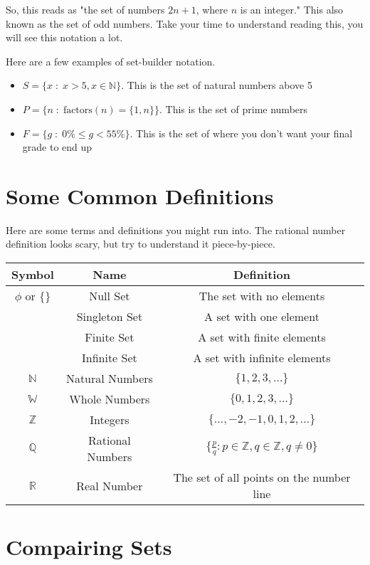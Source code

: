 So, this reads as "the set of numbers $2n+1$, where $n$ is an integer." This also known as the set of odd numbers. Take your time to understand reading this, you will see this notation a lot.

\myexample
{
	Here are a few examples of set-builder notation.
	\begin{itemize}
		\item $S = \{x \;:\; x > 5, x \in \mathbb{N}\}$. This is the set of natural numbers above 5
		\item $P = \{n \;:\; \text{factors}(n) = \{1,n\}\}$. This is the set of prime numbers
		\item $F = \{g \;:\; 0\% \leq g < 55\%\}$. This is the set of where you don't want your final grade to end up
	\end{itemize}
}
	
\section{Some Common Definitions}

Here are some terms and definitions you might run into. The rational number definition looks scary, but try to understand it piece-by-piece.

\begin{tabular}{|c|c|c|}
\hline
Symbol & Name & Definition\\
\hline
$\phi$ or $\{\}$ & Null Set & The set with no elements\\
 & Singleton Set & A set with one element\\
 & Finite Set & A set with finite elements\\
 & Infinite Set & A set with infinite elements\\
$\mathbb{N}$ & Natural Numbers & $\{1,2,3,\dots\}$\\
$\mathbb{W}$ & Whole Numbers & $\{0,1,2,3,\dots\}$\\
$\mathbb{Z}$ & Integers & $\{\dots, -2, -1, 0, 1, 2, \dots\}$\\
$\mathbb{Q}$ & Rational Numbers &
$\displaystyle \bigg\{ \frac{p}{q} : p \in \mathbb{Z}, q \in \mathbb{Z}, q \neq 0 \bigg\}$\\
$\mathbb{R}$ & Real Number & The set of all points on the number line\\
\hline
\end{tabular}

\section{Compairing Sets}

